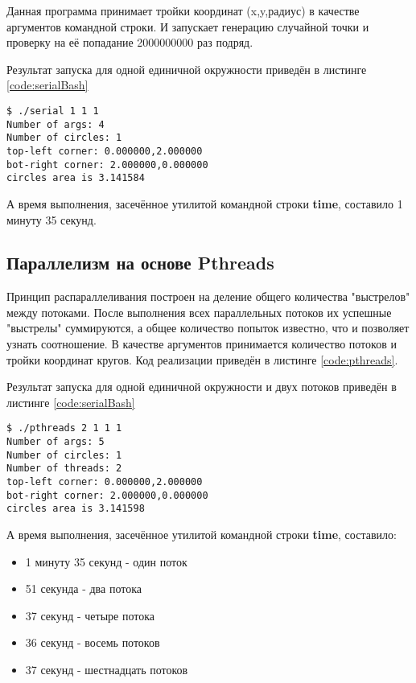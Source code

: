 Данная программа принимает тройки координат (x,y,радиус) в качестве аргументов командной строки. И запускает генерацию случайной точки и проверку на её попадание 2000000000 раз подряд.

Результат запуска для одной единичной окружности приведён в листинге \ref{code:serialBash}

\begin{lstlisting}[label=code:serialBash]
$ ./serial 1 1 1
Number of args: 4
Number of circles: 1
top-left corner: 0.000000,2.000000
bot-right corner: 2.000000,0.000000
circles area is 3.141584 
\end{lstlisting}

А время выполнения, засечённое утилитой командной строки \textbf{time}, составило 1 минуту 35 секунд.

\subsection{Параллелизм на основе Pthreads}
\label{sec:pthreads}

Принцип распараллеливания построен на деление общего количества "выстрелов" между потоками. После выполнения всех параллельных потоков их успешные "выстрелы" суммируются, а общее количество попыток известно, что и позволяет узнать соотношение. В качестве аргументов принимается количество потоков и тройки координат кругов. Код реализации приведён в листинге \ref{code:pthreads}.


\parindent=1cm %

Результат запуска для одной единичной окружности и двух потоков приведён в листинге \ref{code:serialBash}

\begin{lstlisting}[label=code:serialBash]
$ ./pthreads 2 1 1 1
Number of args: 5
Number of circles: 1
Number of threads: 2
top-left corner: 0.000000,2.000000
bot-right corner: 2.000000,0.000000
circles area is 3.141598 
\end{lstlisting}

А время выполнения, засечённое утилитой командной строки \textbf{time}, составило:
\begin{itemize}
\item 1 минуту 35 секунд - один поток
\item 51 секунда - два потока
\item 37 секунд - четыре потока
\item 36 секунд - восемь потоков
\item 37 секунд - шестнадцать  потоков
\end{itemize}

